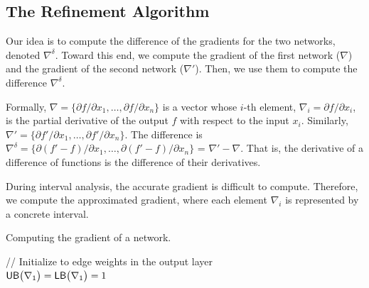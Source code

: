 \subsection{The Refinement Algorithm}


Our idea is to compute the difference of the gradients for the two
networks, denoted $\nabla^\delta$.  Toward this end, we compute the
gradient of the first network ($\nabla$) and the gradient of the
second network ($\nabla'$).  Then, we use them to compute the
difference $\nabla^\delta$.


Formally, $\nabla = \{ \partial f/\partial x_1, \ldots, \partial
f/\partial x_n\}$ is a vector whose $i$-th element, $\nabla_i
= \partial f/\partial x_i$, is the partial derivative of the output
$f$ with respect to the input $x_i$.  Similarly, $\nabla' = \{\partial
f'/\partial x_1,\dots, \partial f'/\partial x_n\}$.
%
The difference is $\nabla^\delta = \{\partial (f'-f)/\partial
x_1, \dots, \partial (f'-f)/\partial x_n\}$ = $\nabla' - \nabla$.
That is, the derivative of a difference of functions is the difference
of their derivatives.


During interval analysis, the accurate gradient is difficult to
compute. Therefore, we compute the approximated gradient, where each
element $\nabla_i$ is represented by a concrete interval.


\begin{algorithm}[t]
\caption{Computing the gradient of a network.}
\label{alg:gradient}
{\footnotesize
	\SetAlgoLined
        \textcolor{dkgreen}{// Initialize to edge weights in the output layer}\\
	$ \mathsf{UB}\big(\nabla_1\big) = \mathsf{LB}\big(\nabla_1\big) = 1 $\\
	\Return{$ \nabla $}
}
\end{algorithm}


